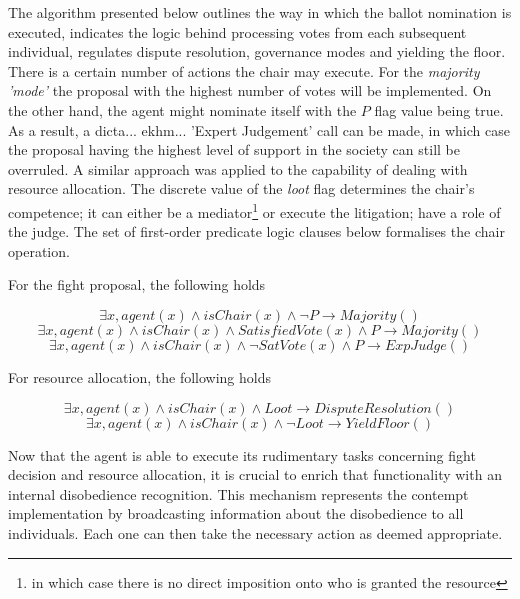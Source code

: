The algorithm presented below outlines the way in which the ballot nomination is executed, indicates the logic behind processing votes from each subsequent individual, regulates dispute resolution, governance modes and yielding the floor. There is a certain number of actions the chair may execute. For the \textit{majority 'mode'} the proposal with the highest number of votes will be implemented. On the other hand, the agent might nominate itself with the $P$ flag value being true. As a result, a dicta... ekhm... 'Expert Judgement' call can be made,  in which case the proposal having the highest level of support in the society can still be overruled. A similar approach was applied to the capability of dealing with resource allocation. The discrete value of the \textit{loot} flag determines the chair's competence; it can either be a mediator\footnote{in which case there is no direct imposition onto who is granted the resource} or execute the litigation; have a role of the judge. The set of first-order predicate logic clauses below formalises the chair operation.

For the fight proposal, the following holds

\begin{equation}
    \exists x, agent(x) \land isChair(x) \land \neg P \rightarrow Majority()
\end{equation}
\begin{equation}
    \exists x, agent(x) \land isChair(x) \land SatisfiedVote(x) \land P \rightarrow Majority()
\end{equation}
\begin{equation}
    \exists x, agent(x) \land isChair(x) \land \neg SatVote(x) \land P \rightarrow ExpJudge()
\end{equation}

For resource allocation, the following holds

\begin{equation}
    \exists x, agent(x) \land isChair(x) \land Loot \rightarrow DisputeResolution()
\end{equation}
\begin{equation}
    \exists x, agent(x) \land isChair(x) \land \neg Loot \rightarrow YieldFloor()
\end{equation}

Now that the agent is able to execute its rudimentary tasks concerning fight decision and resource allocation, it is crucial to enrich that functionality with an internal disobedience recognition. This mechanism represents the contempt implementation by broadcasting information about the disobedience to all individuals. Each one can then take the necessary action as deemed appropriate. 



